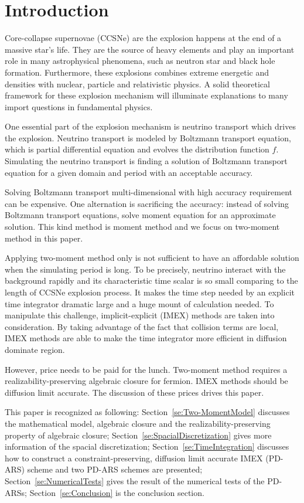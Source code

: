 \section{Introduction}

Core-collapse supernovae (CCSNe) are the explosion happens at the end of a massive star's life.
They are the source of heavy elements and play an important role in many astrophysical phenomena, such as neutron star and black hole formation.
Furthermore, these explosions combines extreme energetic and densities with nuclear, particle and relativistic physics. 
A solid theoretical framework for these explosion mechanism will illuminate explanations to many import questions in fundamental physics.

One essential part of the explosion mechanism is neutrino transport which drives the explosion.
Neutrino transport is modeled by Boltzmann transport equation, which is partial differential equation and evolves the distribution function $f$.
Simulating the neutrino transport is finding a solution of Boltzmann transport equation for a given domain and period with an acceptable accuracy.

Solving Boltzmann transport multi-dimensional with high accuracy requirement can be expensive.
One alternation is sacrificing the accuracy: instead of solving Boltzmann transport equations, solve moment equation for an approximate solution.
This kind method is moment method and we focus on two-moment method in this paper.

Applying two-moment method only is not sufficient to have an affordable solution when the simulating period is long.
To be precisely, neutrino interact with the background rapidly and its characteristic time scalar is so small comparing to the length of CCSNe explosion process. 
It makes the time step needed by an explicit time integrator dramatic large and a huge mount of calculation needed. 
To manipulate this challenge, implicit-explicit (IMEX) methods are taken into consideration.
By taking advantage of the fact that collision terms are local, IMEX methods are able to make the time integrator more efficient in diffusion dominate region.

However, price needs to be paid for the lunch.
Two-moment method requires a realizability-preserving algebraic closure for fermion.
IMEX methods should be diffusion limit accurate. 
The discussion of these prices drives this paper. 


This paper is recognized as following: Section~\ref{se:Two-MomentModel} discusses the mathematical model, algebraic closure and the realizability-preserving property of algebraic closure;
Section~\ref{se:SpacialDiscretization} gives more information of the spacial discretization; Section~\ref{se:TimeIntegration} discusses how to construct a constraint-preserving, diffusion limit accurate IMEX (PD-ARS) scheme and two PD-ARS schemes are presented; Section~\ref{se:NumericalTests} gives the result of the numerical tests of the PD-ARSs; Section~\ref{se:Conclusion} is the conclusion section.